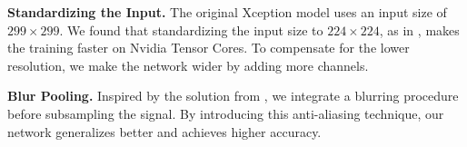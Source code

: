 \textbf{Standardizing the Input.}
The original Xception model uses an input size of $299\times299$. We found that standardizing the input size to $224\times224$, as in \citet{HeEtAl2015}, makes the training faster on Nvidia Tensor Cores. To compensate for the lower resolution, we make the network wider by adding more channels. 

\textbf{Blur Pooling.}
Inspired by the solution from \citet{Zhang2019}, we integrate a blurring procedure before subsampling the signal. By introducing this anti-aliasing technique, our network generalizes better and achieves higher accuracy.

